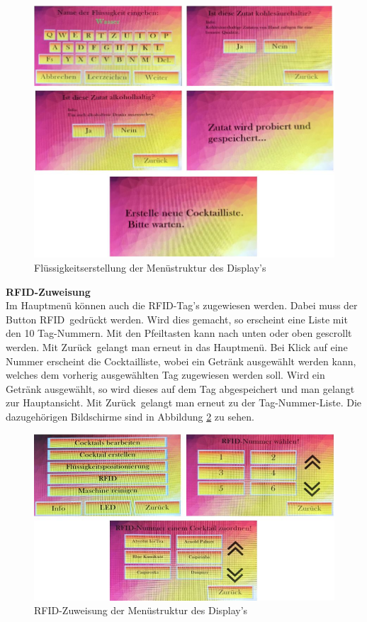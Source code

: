 \begin{figure}[H]
	\centering
	\includegraphics[width=\textwidth]{graphics/DisplayPositionierung2}
	\caption{Flüssigkeitserstellung der Menüstruktur des Display's}
	\label{fig:DisplayPositionierung2}
\end{figure}

\textbf{RFID-Zuweisung}\\
Im Hauptmenü können auch die RFID-Tag's zugewiesen werden. Dabei muss der Button \flqq RFID\frqq~\newline gedrückt werden. Wird dies gemacht, so erscheint eine Liste mit den 10 Tag-Nummern. Mit den Pfeiltasten kann nach unten oder oben gescrollt werden. Mit \flqq Zurück\frqq~gelangt man erneut in das Hauptmenü. Bei Klick auf eine Nummer erscheint die Cocktailliste, wobei ein Getränk ausgewählt werden kann, welches dem vorherig ausgewählten Tag zugewiesen werden soll. Wird ein Getränk ausgewählt, so wird dieses auf dem Tag abgespeichert und man gelangt zur Hauptansicht. Mit \flqq Zurück\frqq~gelangt man erneut zu der Tag-Nummer-Liste. Die dazugehörigen Bildschirme sind in Abbildung \ref{fig:DisplayRFID} zu sehen. 

\begin{figure}[H]
	\centering
	\includegraphics[width=\textwidth]{graphics/DisplayRFID}
	\caption{RFID-Zuweisung der Menüstruktur des Display's}
	\label{fig:DisplayRFID}
\end{figure}

